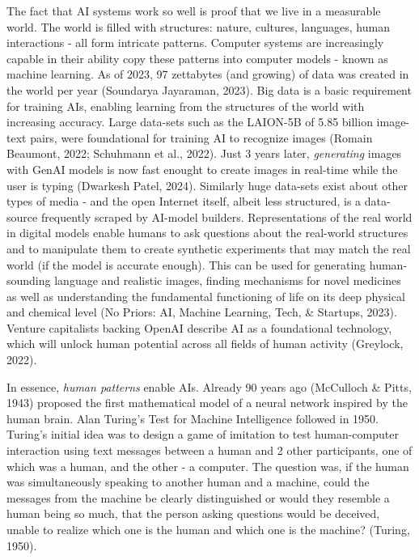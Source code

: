 \documentclass[
  12pt,
  letterpaper,
  DIV=11,
  numbers=noendperiod]{scrartcl}
\begin{document}
The fact that AI systems work so well is proof that we live in a
measurable world. The world is filled with structures: nature, cultures,
languages, human interactions - all form intricate patterns. Computer
systems are increasingly capable in their ability copy these patterns
into computer models - known as machine learning. As of 2023, 97
zettabytes (and growing) of data was created in the world per year
(Soundarya Jayaraman, 2023). Big data is a basic requirement for
training AIs, enabling learning from the structures of the world with
increasing accuracy. Large data-sets such as the LAION-5B of 5.85
billion image-text pairs, were foundational for training AI to recognize
images (Romain Beaumont, 2022; Schuhmann et al., 2022). Just 3 years
later, \emph{generating} images with GenAI models is now fast enought to
create images in real-time while the user is typing (Dwarkesh Patel,
2024). Similarly huge data-sets exist about other types of media - and
the open Internet itself, albeit less structured, is a data-source
frequently scraped by AI-model builders. Representations of the real
world in digital models enable humans to ask questions about the
real-world structures and to manipulate them to create synthetic
experiments that may match the real world (if the model is accurate
enough). This can be used for generating human-sounding language and
realistic images, finding mechanisms for novel medicines as well as
understanding the fundamental functioning of life on its deep physical
and chemical level (No Priors: AI, Machine Learning, Tech, \& Startups,
2023). Venture capitalists backing OpenAI describe AI as a foundational
technology, which will unlock human potential across all fields of human
activity (Greylock, 2022).

In essence, \emph{human patterns} enable AIs. Already 90 years ago
(McCulloch \& Pitts, 1943) proposed the first mathematical model of a
neural network inspired by the human brain. Alan Turing's Test for
Machine Intelligence followed in 1950. Turing's initial idea was to
design a game of imitation to test human-computer interaction using text
messages between a human and 2 other participants, one of which was a
human, and the other - a computer. The question was, if the human was
simultaneously speaking to another human and a machine, could the
messages from the machine be clearly distinguished or would they
resemble a human being so much, that the person asking questions would
be deceived, unable to realize which one is the human and which one is
the machine? (Turing, 1950).
\end{document}
